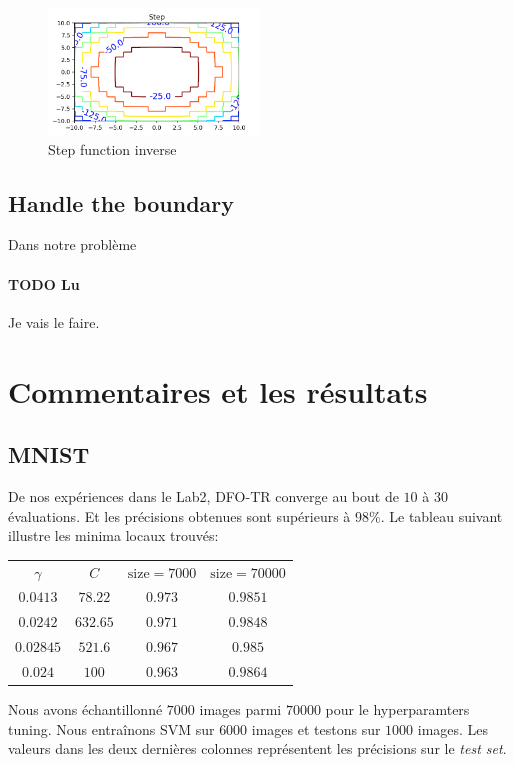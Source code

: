 \documentclass[12 pt, a4paper]{article}
\begin{document}
\begin{figure}[h]
\centering
\includegraphics[width = 0.5\textwidth]{Step_function_inverse.png}
\caption{Step function inverse}
\label{fig:step}
\end{figure}

\subsection{Handle the boundary}
Dans notre problème 

\paragraph*{TODO Lu} Je vais le faire. 




\section{Commentaires et les résultats}\label{results}

\subsection{MNIST}

De nos expériences dans le Lab2, DFO-TR converge au bout de $10$ à $30$ évaluations. Et les précisions obtenues sont supérieurs à $98\%$. Le tableau suivant illustre les minima locaux trouvés:

\begin{center}
\begin{tabular}{|c|c|c|c|}
  \hline
  $\gamma$ & $C$ & $\text{size}=7000$ & $\text{size}=70000$ \\
  $0.0413$ & $78.22$ & $0.973$ & $0.9851$ \\
  $0.0242$ & $632.65$ & $0.971$ & $0.9848$ \\
  $0.02845$ & $521.6$ & $0.967$ & $0.985$ \\
  $0.024$ & $100$ & $0.963$ & $0.9864$ \\
  \hline
\end{tabular}
\end{center}
Nous avons échantillonné $7000$ images parmi $70000$ pour le hyperparamters tuning. Nous entraînons SVM sur $6000$ images et testons sur $1000$ images. Les valeurs dans les deux dernières colonnes représentent les précisions sur le \emph{test set}.
\end{document}
